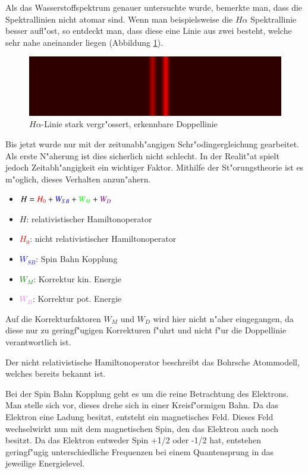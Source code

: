 \begin{refsection}
Als das Wasserstoffspektrum genauer untersuchte wurde, bemerkte man,
dass die Spektrallinien nicht atomar sind. Wenn man beispielsweise die
$H\alpha$ Spektrallinie besser aufl"ost, so entdeckt man, dass diese
eine Linie aus zwei besteht, welche sehr nahe aneinander
liegen (Abbildung \ref{atomuhr:fineStructure}).

\begin{figure}
	\centering
	\includegraphics[width = .6\columnwidth]{atomuhr/fine_structure_hydrogen.png}
	\caption{$H\alpha$-Linie stark vergr"ossert, erkennbare
          Doppellinie \cite{pic:wasserstoff_feinstruktur}}
        \label{atomuhr:fineStructure}
\end{figure}

Bis jetzt wurde nur mit der zeitunabh"angigen Schr"odingergleichung gearbeitet.
Als erste N"aherung ist dies sicherlich nicht schlecht.
In der Realit"at spielt jedoch Zeitabh"angigkeit ein wichtiger Faktor. 
Mithilfe der St"orungstheorie ist es m"oglich, dieses Verhalten anzun"ahern.

\begin{itemize}
	\item[]  $H = \textcolor{red}{H_0}+ \textcolor{blue}{W_{SB}} + 
		\textcolor{green}{W_M} + \textcolor{violet}{W_D} $
	\item[]  $H$: relativistischer Hamiltonoperator
	\item[]  \textcolor{red}{$H_0$}: nicht relativistischer Hamiltonoperator
	\item[]  \textcolor{blue}{$W_{SB}$}: Spin Bahn Kopplung
	\item[]  \textcolor{green}{$W_M$}: Korrektur kin. Energie
	\item[]  \textcolor{violet}{$W_D$}: Korrektur pot. Energie
	
\end{itemize}
		
Auf die Korrekturfaktoren $W_M$ und $W_D$ wird hier nicht n"aher
eingegangen, da diese nur zu geringf"ugigen Korrekturen f"uhrt und
nicht f"ur die Doppellinie verantwortlich ist.

Der nicht relativistische Hamiltonoperator beschreibt das Bohrsche
Atommodell, welches bereits bekannt ist.

Bei der Spin Bahn Kopplung geht es um die reine Betrachtung des
Elektrons. Man stelle sich vor, dieses drehe sich in einer Kreisf"ormigen Bahn.  Da das
Elektron eine Ladung besitzt, entsteht ein magnetisches Feld.  Dieses
Feld wechselwirkt nun mit dem magnetischen Spin, den das Elektron auch
noch besitzt.  Da das Elektron entweder Spin +1/2 oder -1/2 hat,
entstehen geringf"ugig unterschiedliche Frequenzen bei einem
Quantensprung in das jeweilige Energielevel.


\end{refsection}
